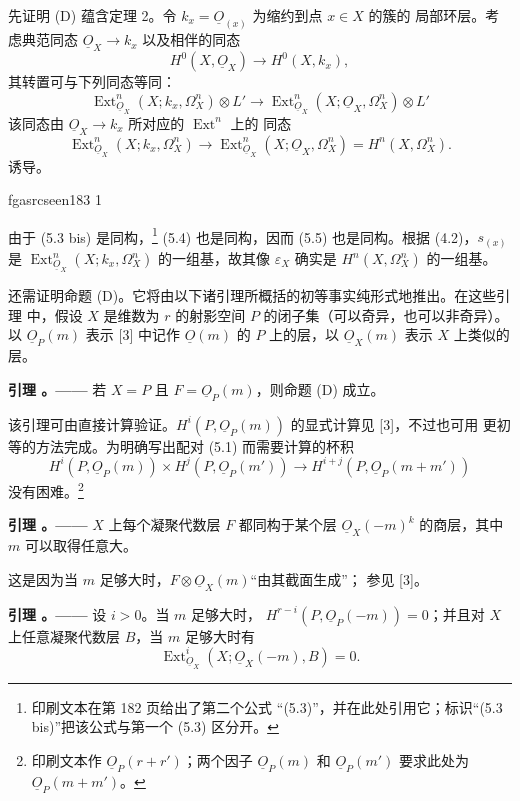 \documentclass[12pt,twoside,openany]{book}
\numberwithin{equation}{section}
\newcommand{\fgaunitid}{unbound}
\newcommand{\src}[1]{%
  \phantomsection
  \hypertarget{src:\fgaunitid:#1}{}%
  \hypertarget{fga.\fgaunitid.p#1}{}%
  \ifcsname fgasrcseen#1\endcsname\else
    \expandafter\gdef\csname fgasrcseen#1\endcsname{1}%
    \hypertarget{src:#1}{}%
  \fi
  \marginpar{\raggedleft\footnotesize\sffamily #1}%
}
\newcommand{\Osh}{\underline{O}}
\newcommand{\fquote}[1]{“#1”}
\theoremstyle{plain}
\theoremstyle{definition}
\theoremstyle{remark}
\newcommand{\result}[2]{%
  \par\medskip\noindent\textbf{#1%
  \if\relax\detokenize{#2}\relax\else\space#2\fi。——}\enspace
}
\begin{document}
先证明 (D) 蕴含定理 2。令 $k_x=\Osh_{(x)}$ 为缩约到点 $x\in X$ 的簇的
局部环层。考虑典范同态 $\Osh_X\longrightarrow k_x$ 以及相伴的同态
\begin{equation}\tag{5.3 bis}
  H^{0}(X,\Osh_X)\longrightarrow H^{0}(X,k_x),
\end{equation}
其转置可与下列同态等同：
\begin{equation}\tag{5.4}
  \operatorname{Ext}_{\Osh_X}^{n}(X;k_x,\Omega_X^{n})\otimes L'
  \longrightarrow
  \operatorname{Ext}_{\Osh_X}^{n}(X;\Osh_X,\Omega_X^{n})\otimes L'
\end{equation}
该同态由 $\Osh_X\longrightarrow k_x$ 所对应的 $\operatorname{Ext}^{n}$ 上的
同态
\begin{equation}\tag{5.5}
  \operatorname{Ext}_{\Osh_X}^{n}(X;k_x,\Omega_X^{n})
  \longrightarrow
  \operatorname{Ext}_{\Osh_X}^{n}(X;\Osh_X,\Omega_X^{n})
  =H^{n}(X,\Omega_X^{n}).
\end{equation}
诱导。

\src{183}
由于 (5.3 bis) 是同构，\footnote{印刷文本在第 182 页给出了第二个公式
“(5.3)”，并在此处引用它；标识“(5.3 bis)”把该公式与第一个 (5.3) 区分开。}
(5.4) 也是同构，因而 (5.5) 也是同构。根据 (4.2)，$s_{(x)}$ 是
$\operatorname{Ext}_{\Osh_X}^{n}(X;k_x,\Omega_X^{n})$ 的一组基，故其像
$\varepsilon_X$ 确实是 $H^{n}(X,\Omega_X^{n})$ 的一组基。

还需证明命题 (D)。它将由以下诸引理所概括的初等事实纯形式地推出。在这些引理
中，假设 $X$ 是维数为 $r$ 的射影空间 $P$ 的闭子集（可以奇异，也可以非奇异）。
以 $\Osh_P(m)$ 表示 [3] 中记作 $\Osh(m)$ 的 $P$ 上的层，以 $\Osh_X(m)$
表示 $X$ 上类似的层。

\result{引理}{2} 若 $X=P$ 且 $F=\Osh_P(m)$，则命题 (D) 成立。

该引理可由直接计算验证。$H^{i}(P,\Osh_P(m))$ 的显式计算见 [3]，不过也可用
更初等的方法完成。为明确写出配对 (5.1) 而需要计算的杯积
\[
  H^{i}(P,\Osh_P(m))\times H^{j}(P,\Osh_P(m'))
  \longrightarrow H^{i+j}(P,\Osh_P(m+m'))
\]
没有困难。\footnote{印刷文本作 $\Osh_P(r+r')$；两个因子 $\Osh_P(m)$ 和
$\Osh_P(m')$ 要求此处为 $\Osh_P(m+m')$。}

\result{引理}{3} $X$ 上每个凝聚代数层 $F$ 都同构于某个层
$\Osh_X(-m)^{k}$ 的商层，其中 $m$ 可以取得任意大。

这是因为当 $m$ 足够大时，$F\otimes\Osh_X(m)$\fquote{由其截面生成}；
参见 [3]。

\result{引理}{4} 设 $i>0$。当 $m$ 足够大时，
$H^{r-i}(P,\Osh_P(-m))=0$；并且对 $X$ 上任意凝聚代数层 $B$，当 $m$
足够大时有
\[
  \operatorname{Ext}_{\Osh_X}^{i}(X;\Osh_X(-m),B)=0.
\]
\end{document}
